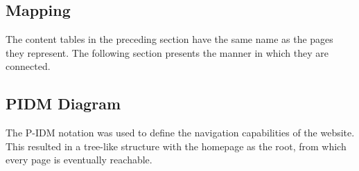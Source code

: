 \subsection{Mapping}
The content tables in the preceding section have the same name as the pages they represent. 
The following section presents the manner in which they are connected.

\subsection{PIDM Diagram}
The P-IDM notation was used to define the navigation capabilities of the website. 
This resulted in a tree-like structure with the homepage as the root, from which every page is eventually reachable.

